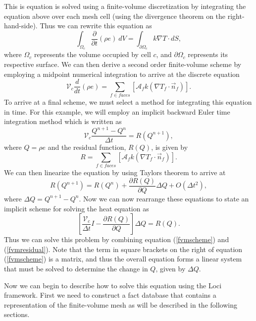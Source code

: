 \documentclass[10pt,epsf,letterpaper,twoside]{book}
\begin{document}
This is equation is solved using a finite-volume discretization by
integrating the equation above over each mesh cell (using the
divergence theorem on the right-hand-side).  Thus we can
rewrite this equation as
\begin{equation}
\int_{\Omega_c} \frac{\partial}{\partial t} (\rho e) ~dV =
\int_{\partial\Omega_c} k \nabla T \cdot dS,
\end{equation}
where $\Omega_c$ represents the volume occupied by cell $c$, and
$\partial\Omega_c$ represents its respective surface.  We can then
derive a second order finite-volume scheme by employing a midpoint
numerical integration to arrive at the discrete equation
\begin{equation}
\mathcal{V}_c \frac{d}{dt} (\rho e) = \sum_{f\in{faces}}
\left[ \mathcal{A}_f k \left(\nabla T_f \cdot \vec{n}_f\right) \right].
\end{equation}
To arrive at a final scheme, we must select a method for integrating
this equation in time.  For this example, we will employ an implicit
backward Euler time integration method which is written as
\begin{equation}
\mathcal{V}_c\frac{Q^{n+1}-Q^n}{\Delta t} = R(Q^{n+1}),
\end{equation}
where $Q=\rho e$ and the residual function, $R(Q)$, is given by 
\begin{equation}
R = \sum_{f\in{faces}}
\left[ \mathcal{A}_f k \left(\nabla T_f \cdot \vec{n}_f\right)
\right].
\label{fvmresidual}
\end{equation}
We can then linearize the equation by using Taylors theorem to arrive
at
\begin{equation}
R(Q^{n+1}) = R(Q^n) + \frac{\partial R(Q)}{\partial Q} \Delta Q +
O(\Delta t^2),
\end{equation}
where $\Delta Q = Q^{n+1}-Q^n$.  Now we can now rearrange these
equations to state an implicit scheme for solving the heat equation
as
\begin{equation}
\left[ \frac{\mathcal{V}_c}{\Delta t} I - \frac{\partial R(Q)}{\partial Q}\right]\Delta Q =
R(Q).
\label{fvmscheme}
\end{equation}
Thus we can solve this problem by combining equation (\ref{fvmscheme})
and (\ref{fvmresidual}).  Note that the term in square brackets on the
right of equation (\ref{fvmscheme}) is a matrix, and thus the overall
equation forms a linear system that must be solved to determine the
change in $Q$, given by $\Delta Q$.

Now we can begin to describe how to solve this equation using the Loci
framework.  First we need to construct a fact database that contains a
representation of the finite-volume mesh as will be described in the
following sections.
\end{document}
